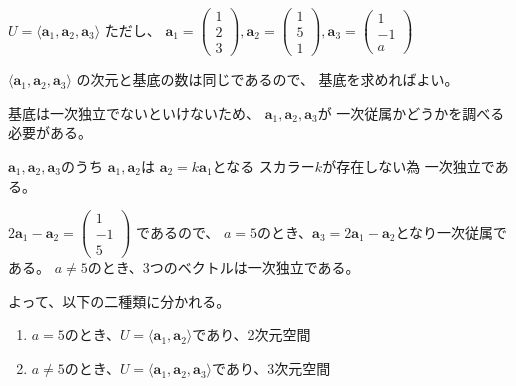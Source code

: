 \documentclass[12pt,b5paper]{ltjsarticle}
\begin{document}
$U=\langle \bm{a}_1,\bm{a}_2,\bm{a}_3 \rangle$
ただし、
$\bm{a}_1=\begin{pmatrix}1\\2\\3\end{pmatrix},
\bm{a}_2=\begin{pmatrix}1\\5\\1\end{pmatrix},
\bm{a}_3=\begin{pmatrix}1\\-1\\a\end{pmatrix}$

\dotfill

$\langle \bm{a}_1,\bm{a}_2,\bm{a}_3 \rangle$
の次元と基底の数は同じであるので、
基底を求めればよい。

基底は一次独立でないといけないため、
$\bm{a}_1,\bm{a}_2,\bm{a}_3$が
一次従属かどうかを調べる必要がある。

\dotfill

$\bm{a}_1,\bm{a}_2,\bm{a}_3$のうち
$\bm{a}_1,\bm{a}_2$は
$\bm{a}_2=k\bm{a}_1$となる
スカラー$k$が存在しない為
一次独立である。

$2\bm{a}_1-\bm{a}_2 =\begin{pmatrix}1\\-1\\5\end{pmatrix}$
であるので、
$a=5$のとき、$\bm{a}_3=2\bm{a}_1-\bm{a}_2$となり一次従属である。
$a\ne5$のとき、3つのベクトルは一次独立である。

よって、以下の二種類に分かれる。
\begin{enumerate}
 \item $a=5$のとき、$U=\langle \bm{a}_1,\bm{a}_2\rangle$であり、2次元空間
 \item $a\ne5$のとき、$U=\langle \bm{a}_1,\bm{a}_2,\bm{a}_3 \rangle$であり、3次元空間
\end{enumerate}


\hrulefill
\end{document}
